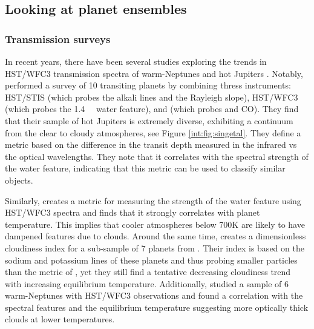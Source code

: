 

\subsection{Looking at planet ensembles}


\subsubsection{Transmission surveys}


In recent years, there have been several studies exploring the trends in HST/WFC3 transmission spectra of warm-Neptunes \citep{Crossfield2017} and hot Jupiters \citep{Stevenson2016a, Sing2016, Heng2016, Barstow2017, Fu2017, Tsiaras2018}. Notably, \citet{Sing2016} performed a survey of 10 transiting planets by combining thress instruments: HST/STIS (which probes the alkali lines and the Rayleigh slope), HST/WFC3 (which probes the 1.4~\um~ water feature), and \spitzerIRAC (which probes  and CO). They find that their sample of hot Jupiters is extremely diverse, exhibiting a continuum from the clear to cloudy atmospheres, see Figure \ref{int:fig:singetal}. They define a metric based on the difference in the transit depth measured in the infrared vs the optical wavelengths. They note that it correlates with the spectral strength of the water feature, indicating that this metric can be used to classify similar objects.

Similarly, \citet{Stevenson2016b} creates a metric for measuring the strength of the water feature using HST/WFC3 spectra and finds that it strongly correlates with planet temperature. This implies that cooler atmospheres below 700K are likely to have dampened features due to clouds. Around the same time, \citet{Heng2016} creates a dimensionless cloudiness index for a sub-sample of 7 planets from \citet{Sing2016}. Their index is based on the sodium and potassium lines of these planets and thus probing smaller particles than the metric of \citet{Stevenson2016b}, yet they still find a tentative decreasing cloudiness trend with increasing equilibrium temperature. Additionally, \citet{Crossfield2017} studied a sample of 6 warm-Neptunes with HST/WFC3 observations and found a correlation with the spectral features and the equilibrium temperature suggesting more optically thick clouds at lower temperatures.


